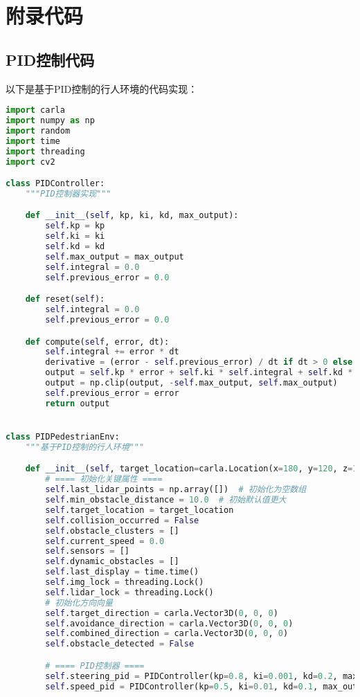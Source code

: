 \chapter{附录代码}

\section{PID控制代码}

以下是基于PID控制的行人环境的代码实现：

\begin{lstlisting}[language=Python]
import carla
import numpy as np
import random
import time
import threading
import cv2

class PIDController:
    """PID控制器实现"""

    def __init__(self, kp, ki, kd, max_output):
        self.kp = kp
        self.ki = ki
        self.kd = kd
        self.max_output = max_output
        self.integral = 0.0
        self.previous_error = 0.0

    def reset(self):
        self.integral = 0.0
        self.previous_error = 0.0

    def compute(self, error, dt):
        self.integral += error * dt
        derivative = (error - self.previous_error) / dt if dt > 0 else 0.0
        output = self.kp * error + self.ki * self.integral + self.kd * derivative
        output = np.clip(output, -self.max_output, self.max_output)
        self.previous_error = error
        return output


class PIDPedestrianEnv:
    """基于PID控制的行人环境"""

    def __init__(self, target_location=carla.Location(x=180, y=120, z=1)):
        # ==== 初始化关键属性 ====
        self.last_lidar_points = np.array([])  # 初始化为空数组
        self.min_obstacle_distance = 10.0  # 初始默认值更大
        self.target_location = target_location
        self.collision_occurred = False
        self.obstacle_clusters = []
        self.current_speed = 0.0
        self.sensors = []
        self.dynamic_obstacles = []
        self.last_display = time.time()
        self.img_lock = threading.Lock()
        self.lidar_lock = threading.Lock()
        # 初始化方向向量
        self.target_direction = carla.Vector3D(0, 0, 0)
        self.avoidance_direction = carla.Vector3D(0, 0, 0)
        self.combined_direction = carla.Vector3D(0, 0, 0)
        self.obstacle_detected = False

        # ==== PID控制器 ====
        self.steering_pid = PIDController(kp=0.8, ki=0.001, kd=0.2, max_output=30)
        self.speed_pid = PIDController(kp=0.5, ki=0.01, kd=0.1, max_output=3.0)


\end{lstlisting}
